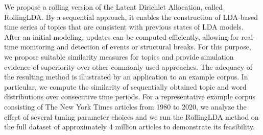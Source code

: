 We propose a rolling version of the Latent Dirichlet Allocation, called RollingLDA. By a sequential approach, it enables the construction of LDA-based time series of topics that are consistent with previous states of LDA models. After an initial modeling, updates can be computed efficiently, allowing for real-time monitoring and detection of events or structural breaks. For this purpose, we propose suitable similarity measures for topics and provide simulation evidence of superiority over other commonly used approaches. The adequacy of the resulting method is illustrated by an application to an example corpus. In particular, we compute the similarity of sequentially obtained topic and word distributions over consecutive time periods. For a representative example corpus consisting of The New York Times articles from 1980 to 2020, we analyze the effect of several tuning parameter choices and we run the RollingLDA method on the full dataset of approximately 4 million articles to demonstrate its feasibility.
